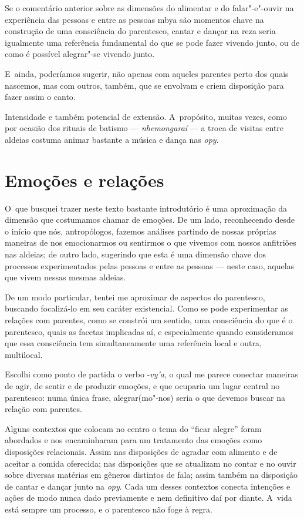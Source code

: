 Se o comentário anterior sobre as dimensões do alimentar e do
falar"-e"-ouvir na experiência das pessoas e entre as pessoas mbya são
momentos chave na construção de uma consciência do parentesco, cantar e
dançar na reza seria igualmente uma referência fundamental do que se
pode fazer vivendo junto, ou de como é possível alegrar"-se vivendo
junto.

E~ainda, poderíamos sugerir, não apenas com aqueles parentes perto dos
quais nascemos, mas com outros, também, que se envolvam e criem
disposição para fazer assim o canto.

Intensidade e também potencial de extensão. A~propósito, muitas vezes,
como por ocasião dos rituais de batismo --- \emph{nhemongaraí} --- a troca de
visitas entre aldeias costuma animar bastante a música e dança nas \emph{opy}.

\section{Emoções e relações}

O~que busquei trazer neste texto bastante introdutório é uma aproximação
da dimensão que costumamos chamar de emoções. De um lado, reconhecendo
desde o início que nós, antropólogos, fazemos análises partindo de
nossas próprias maneiras de nos emocionarmos ou sentirmos o que vivemos
com nossos anfitriões nas aldeias; de outro lado, sugerindo que esta é
uma dimensão chave dos processos experimentados pelas pessoas e entre
as pessoas --- neste caso, aquelas que vivem nessas mesmas aldeias.

De um modo particular, tentei me aproximar de aspectos do parentesco,
buscando focalizá-lo em seu caráter existencial. Como se pode
experimentar as relações com parentes, como se constrói um sentido, uma
consciência do que é o parentesco, quais as facetas implicadas aí, e
especialmente quando consideramos que essa consciência tem
simultaneamente uma referência local e outra, multilocal.

Escolhi como ponto de partida o verbo -\emph{vy’a}, o qual me parece conectar
maneiras de agir, de sentir e de produzir emoções, e que ocuparia um
lugar central no parentesco: numa única frase, alegrar(mo"-nos) seria o
que devemos buscar na relação com parentes. 

Alguns contextos que colocam no centro o tema do ``ficar alegre'' foram
abordados e nos encaminharam para um tratamento das emoções como
disposições relacionais. Assim nas disposições de agradar com alimento
e de aceitar a comida oferecida; nas disposições que se atualizam no
contar e no ouvir sobre diversas matérias em gêneros distintos de fala;
assim também na disposição de cantar e dançar junto na \emph{opy}. Cada um
desses contextos conecta intenções e ações de modo nunca dado
previamente e nem definitivo daí por diante. A~vida está sempre um
processo, e o parentesco não foge à regra.

